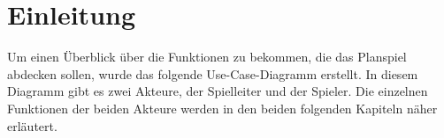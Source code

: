 \section{Einleitung}
\label{sec:fachkonzept-usecase-einleitung}

Um einen Überblick über die Funktionen zu bekommen, die das Planspiel abdecken sollen, wurde das folgende Use-Case-Diagramm erstellt. In diesem Diagramm gibt es zwei Akteure, der Spielleiter und der Spieler. Die einzelnen Funktionen der beiden Akteure werden in den beiden folgenden Kapiteln näher erläutert.